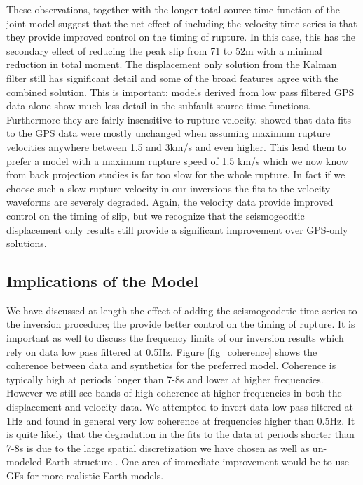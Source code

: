These observations, together with the longer total source time function of the joint model suggest that the net effect of including the velocity time series is that they provide improved control on the timing of rupture. In this case, this has the secondary effect of reducing the peak slip from 71 to 52m with a minimal reduction in total moment. The displacement only solution from the Kalman filter still has significant detail and some of the broad features agree with the combined solution. This is important; models derived from low pass filtered GPS data alone \citep{yue2011} show much less detail in the subfault source-time functions. Furthermore they are fairly insensitive to rupture velocity. \citet{yue2011} showed that data fits to the GPS data were mostly unchanged when assuming maximum rupture velocities anywhere between 1.5 and 3km/s and even higher. This lead them to prefer a model with a maximum rupture speed of 1.5 km/s which we now know from back projection studies \citep{wang2011bp,kiser2012} is far too slow for the whole rupture. In fact if we choose such a slow rupture velocity in our inversions the fits to the velocity waveforms are severely degraded. Again, the velocity data provide improved control on the timing of slip, but we recognize that the seismogeodtic displacement only results still provide a significant improvement over GPS-only solutions.

\subsection{Implications of the Model}

We have discussed at length the effect of adding the seismogeodetic time series to the inversion procedure; the provide better control on the timing of rupture. It is important as well to discuss the frequency limits of our inversion results which rely on data low pass filtered at 0.5Hz. Figure \ref{fig_coherence} shows the coherence between data and synthetics for the preferred model. Coherence is typically high at periods longer than 7-8s and lower at higher frequencies. However we still see bands of high coherence at higher frequencies in both the displacement and velocity data. We attempted to invert data low pass filtered at 1Hz and found in general very low coherence at frequencies higher than 0.5Hz. It is quite likely that the degradation in the fits to the data at periods shorter than 7-8s is due to the large spatial discretization we have chosen as well as un-modeled Earth structure \citep{graves2001,wald2001}. One area of immediate improvement would be to use GFs for more realistic Earth models. 

